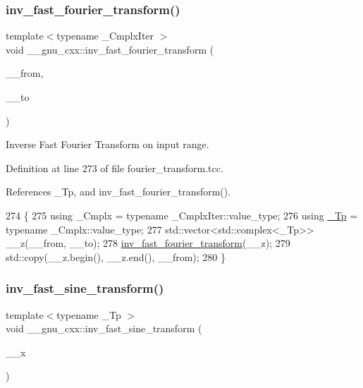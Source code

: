 \subsubsection{\texorpdfstring{inv\+\_\+fast\+\_\+fourier\+\_\+transform()}{inv\_fast\_fourier\_transform()}\hspace{0.1cm}{\footnotesize\ttfamily [3/3]}}
{\footnotesize\ttfamily template$<$typename \+\_\+\+Cmplx\+Iter $>$ \\
void \+\_\+\+\_\+gnu\+\_\+cxx\+::inv\+\_\+fast\+\_\+fourier\+\_\+transform (\begin{DoxyParamCaption}\item[{const \+\_\+\+Cmplx\+Iter \&}]{\+\_\+\+\_\+from,  }\item[{const \+\_\+\+Cmplx\+Iter \&}]{\+\_\+\+\_\+to }\end{DoxyParamCaption})}

Inverse Fast Fourier Transform on input range. 

Definition at line 273 of file fourier\+\_\+transform.\+tcc.



References \+\_\+\+Tp, and inv\+\_\+fast\+\_\+fourier\+\_\+transform().


\begin{DoxyCode}
274     \{
275       \textcolor{keyword}{using} \_Cmplx = \textcolor{keyword}{typename} \_CmplxIter::value\_type;
276       \textcolor{keyword}{using} \hyperlink{namespace____gnu__cxx_a3b19a9c800ca194374ef9172290f7d79}{\_Tp} = \textcolor{keyword}{typename} \_Cmplx::value\_type;
277       std::vector<std::complex<\_Tp>> \_\_z(\_\_from, \_\_to);
278       \hyperlink{namespace____gnu__cxx_a96b56c927599a614656027d3ab4b82ac}{inv\_fast\_fourier\_transform}(\_\_z);
279       std::copy(\_\_z.begin(), \_\_z.end(), \_\_from);
280     \}
\end{DoxyCode}
\mbox{\label{namespace____gnu__cxx_a71c4de302fa0b6716f936d2d925352bd}} 
\subsubsection{\texorpdfstring{inv\+\_\+fast\+\_\+sine\+\_\+transform()}{inv\_fast\_sine\_transform()}}
{\footnotesize\ttfamily template$<$typename \+\_\+\+Tp $>$ \\
void \+\_\+\+\_\+gnu\+\_\+cxx\+::inv\+\_\+fast\+\_\+sine\+\_\+transform (\begin{DoxyParamCaption}\item[{std\+::vector$<$ \hyperlink{namespace____gnu__cxx_a3b19a9c800ca194374ef9172290f7d79}{\+\_\+\+Tp} $>$ \&}]{\+\_\+\+\_\+x }\end{DoxyParamCaption})}

